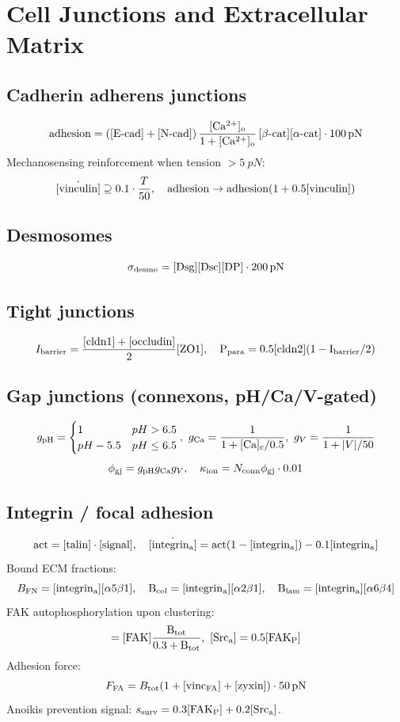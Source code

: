 \documentclass[11pt,a4paper]{article}
\newcommand{\eq}[1]{\begin{equation}#1\end{equation}}
\begin{document}
\clearpage
\section{Cell Junctions and Extracellular Matrix}
\label{sec:junctions}

\subsection{Cadherin adherens junctions}
\eq{ \mathrm{adhesion}=([\rm E\text{-cad}]+[\rm N\text{-cad}])\,\frac{[\rm Ca^{2+}]_o}{1+[\rm Ca^{2+}]_o}\,[\beta\text{-cat}][\alpha\text{-cat}]\cdot 100\,\si{pN} }
Mechanosensing reinforcement when tension $>\SI{5}{pN}$:
\eq{ \dot{[\rm vinculin]}\supseteq 0.1\cdot\frac{T}{50},\quad \mathrm{adhesion}\to\mathrm{adhesion}(1+0.5[\rm vinculin]) }

\subsection{Desmosomes}
\eq{ \sigma_{\rm desmo}=[\rm Dsg][\rm Dsc][\rm DP]\cdot 200\,\si{pN} }

\subsection{Tight junctions}
\eq{ I_{\rm barrier}=\frac{[\rm cldn1]+[\rm occludin]}{2}[\rm ZO1],\quad P_{\rm para}=0.5[\rm cldn2](1-I_{\rm barrier}/2) }

\subsection{Gap junctions (connexons, pH/Ca/V-gated)}
\eq{ g_{\rm pH}=\begin{cases}1 & pH>6.5\\ pH-5.5 & pH\le 6.5\end{cases} ,\ g_{\rm Ca}=\frac{1}{1+[\rm Ca]_c/0.5},\ g_V=\frac{1}{1+|V|/50} }
\eq{ \phi_{\rm gj}=g_{\rm pH}g_{\rm Ca}g_V,\quad \kappa_{\rm ion}=N_{\rm conn}\phi_{\rm gj}\cdot 0.01 }

\subsection{Integrin / focal adhesion}
\eq{ \mathrm{act}=[\rm talin]\cdot[\rm signal],\quad \dot{[\rm integrin_a]}=\mathrm{act}(1-[\rm integrin_a])-0.1[\rm integrin_a] }
Bound ECM fractions:
\eq{ B_{\rm FN}=[\rm integrin_a][\alpha5\beta1],\quad B_{\rm col}=[\rm integrin_a][\alpha2\beta1],\quad B_{\rm lam}=[\rm integrin_a][\alpha6\beta4] }
FAK autophosphorylation upon clustering:
\eq{ [\rm FAK_P]=[\rm FAK]\frac{B_{\rm tot}}{0.3+B_{\rm tot}},\ [\rm Src_a]=0.5[\rm FAK_P] }
Adhesion force:
\eq{ F_{\rm FA}=B_{\rm tot}(1+[\rm vinc_{FA}]+[\rm zyxin])\cdot 50\,\si{pN} }
Anoikis prevention signal: $s_{\rm surv}=0.3[\rm FAK_P]+0.2[\rm Src_a]$.
\end{document}
